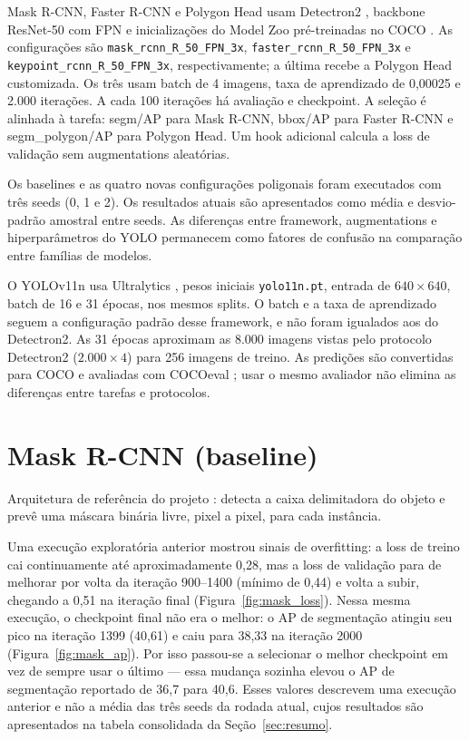 \documentclass[11pt]{article}
\begin{document}
Mask R-CNN, Faster R-CNN e Polygon Head usam Detectron2 \cite{wu2019detectron2},
backbone ResNet-50 com FPN e inicializações do Model Zoo pré-treinadas no COCO
\cite{lin2014coco}. As configurações são
\texttt{mask\_rcnn\_R\_50\_FPN\_3x},
\texttt{faster\_rcnn\_R\_50\_FPN\_3x} e
\texttt{keypoint\_rcnn\_R\_50\_FPN\_3x}, respectivamente; a última recebe a
Polygon Head customizada. Os três usam batch de 4 imagens, taxa de aprendizado de
0,00025 e 2.000 iterações. A cada 100 iterações há avaliação e checkpoint. A seleção é
alinhada à tarefa: segm/AP para Mask R-CNN, bbox/AP para Faster R-CNN e
segm\_polygon/AP para Polygon Head. Um hook adicional calcula a loss de validação
sem augmentations aleatórias.

Os baselines e as quatro novas configurações poligonais foram executados com três
seeds (0, 1 e 2). Os resultados atuais são apresentados como média e desvio-padrão
amostral entre seeds. As diferenças entre framework, augmentations e hiperparâmetros
do YOLO permanecem como fatores de confusão na comparação entre famílias de modelos.

O YOLOv11n usa Ultralytics \cite{ultralytics2024}, pesos iniciais
\texttt{yolo11n.pt}, entrada de $640\times640$, batch de 16 e 31 épocas, nos mesmos
splits. O batch e a taxa de aprendizado seguem a configuração padrão desse
framework, e não foram igualados aos do Detectron2. As 31 épocas aproximam as
8.000 imagens vistas pelo protocolo Detectron2 ($2.000\times4$) para 256 imagens
de treino. As predições são convertidas para COCO e avaliadas com COCOeval
\cite{lin2014coco}; usar o mesmo avaliador não elimina as diferenças entre tarefas
e protocolos.

\section{Mask R-CNN (baseline)}
\label{sec:maskrcnn}

Arquitetura de referência do projeto \cite{he2017mask}: detecta a caixa
delimitadora do objeto e prevê uma máscara binária livre, pixel a pixel, para cada
instância.

Uma execução exploratória anterior mostrou sinais de overfitting: a loss de treino
cai continuamente até aproximadamente 0,28, mas a loss de validação para de melhorar
por volta da iteração 900--1400 (mínimo de 0,44) e volta a subir, chegando a 0,51 na
iteração final (Figura~\ref{fig:mask_loss}). Nessa mesma execução, o checkpoint
final não era o melhor: o AP de segmentação atingiu seu pico na iteração 1399
(40,61) e caiu para 38,33 na iteração 2000 (Figura~\ref{fig:mask_ap}). Por isso
passou-se a selecionar o melhor checkpoint em vez de sempre usar o último --- essa
mudança sozinha elevou o
AP de segmentação reportado de 36,7 para 40,6. Esses valores descrevem uma execução
anterior e não a média das três seeds da rodada atual, cujos resultados são
apresentados na tabela consolidada da Seção~\ref{sec:resumo}.
\end{document}
